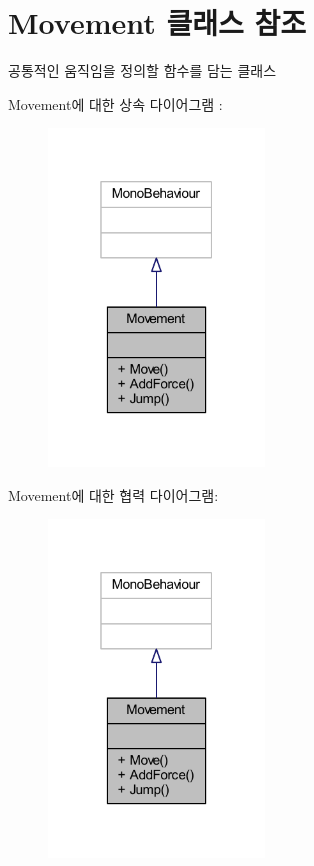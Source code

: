 \hypertarget{class_movement}{}\section{Movement 클래스 참조}
\label{class_movement}


공통적인 움직임을 정의할 함수를 담는 클래스  




Movement에 대한 상속 다이어그램 \+: 
\nopagebreak
\begin{figure}[H]
\begin{center}
\leavevmode
\includegraphics[width=163pt]{d8/d54/class_movement__inherit__graph}
\end{center}
\end{figure}


Movement에 대한 협력 다이어그램\+:
\nopagebreak
\begin{figure}[H]
\begin{center}
\leavevmode
\includegraphics[width=163pt]{d6/dad/class_movement__coll__graph}
\end{center}
\end{figure}
